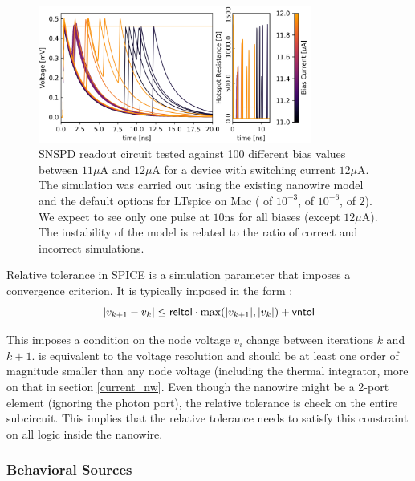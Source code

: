 \begin{figure}
    \centering
    \includegraphics[width=0.8\textwidth]{figs/jumbled_mess_new.png}
    \caption{SNSPD readout circuit tested against 100 different bias values between
    $11\mu$A and $12\mu$A for a device with switching current $12\mu$A. The simulation
    was carried out using the existing nanowire model and the default options for LTspice
    on Mac ( of $10^{-3}$,  of $10^{-6}$,  of $2$). 
    We expect to see only
    one pulse at $10$ns for all biases (except $12\mu$A). The instability of the model is
    related to the ratio of correct and incorrect simulations.}
    \label{fig:sweepbias}
\end{figure}


Relative tolerance in SPICE is a simulation parameter that imposes a convergence criterion.
It is typically imposed in the form \cite{accurate_sim_in_spice_kundert}:
$$|v_{k+1} - v_k| \leq \textsf{reltol} \cdot \max(|v_{k+1}|, |v_k|) + \textsf{vntol}$$

This imposes a condition on the node voltage $v_i$ change between iterations $k$ and $k+1$.
 is equivalent to the voltage resolution and should be at least one order of magnitude
smaller than any node voltage (including the thermal integrator, more on that in section
\ref{current_nw}. Even though the nanowire might be a 2-port element (ignoring the photon port),
the relative tolerance is check on the entire subcircuit. This implies that the relative
tolerance needs to satisfy this constraint on all logic inside the nanowire.

\subsubsection{Behavioral Sources}

